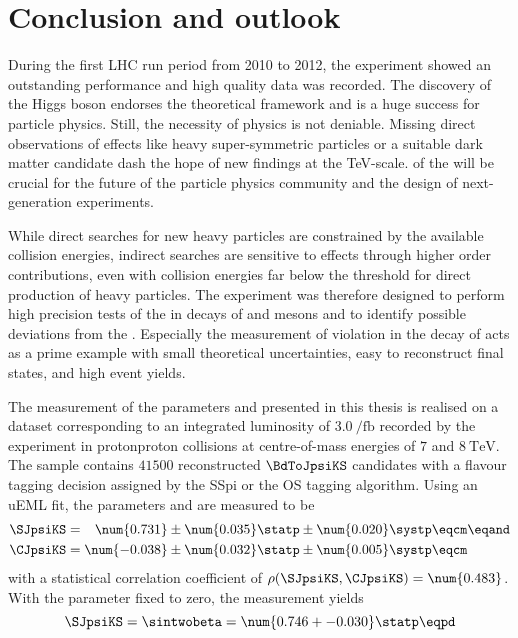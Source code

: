 
\chapter{Conclusion and outlook}
\label{ch:conclusion}

During the first \acs{LHC} run period from 2010 to 2012, the \LHCb experiment
showed an outstanding performance and high quality data was recorded. The
discovery of the Higgs boson \cite{Aad:2015zhl} endorses the theoretical
framework and is a huge success for particle physics. Still, the necessity of
\BSM physics is not deniable. Missing direct observations of \BSM effects like
heavy super-symmetric particles or a suitable dark matter candidate dash the
hope of new findings at the \si{TeV}-scale. \RunTwo of the \LHC will be crucial
for the future of the particle physics community and the design of
next-generation experiments.

While direct searches for new heavy particles are constrained by the available
collision energies, indirect searches are sensitive to \BSM effects through
higher order contributions, even with collision energies far below the threshold
for direct production of heavy particles. The \LHCb experiment was therefore
designed to perform high precision tests of the \SM in decays of \B and \D
mesons and to identify possible deviations from the \SM. Especially the
measurement of \CP violation in the decay of \BdToJpsiKS acts as a prime example
with small theoretical uncertainties, easy to reconstruct final states, and high
event yields.

The measurement of the \CP parameters \SJpsiKS and \CJpsiKS presented in this
thesis is realised on a dataset corresponding to an integrated luminosity of
$\SI{3.0}{\per\femto\barn}$ recorded by the \LHCb experiment in
\acl{protonproton} collisions at centre-of-mass energies of $\num{7}$ and
$\SI{8}{\TeV}$. The sample contains $\num{41500}$ reconstructed $\BdToJpsiKS$
candidates with a flavour tagging decision assigned by the \acl{SSpi} or the
\acl{OS} tagging algorithm. Using an \acl{uEML} fit, the \CP parameters
\SJpsiKS and \CJpsiKS are measured to be
%
\begin{equation*}
  \begin{split}
    \SJpsiKS &= \phantom{-}\num{0.731} \pm \num{0.035} \statp \pm \num{0.020} \systp \eqcm\eqand \\
    \CJpsiKS &=           \num{-0.038} \pm \num{0.032} \statp \pm \num{0.005} \systp \eqcm
  \end{split}
\end{equation*}
%
with a statistical correlation coefficient of $\rho(\SJpsiKS,\CJpsiKS) =
\num{0.483}$. With the parameter \CJpsiKS fixed to zero, the measurement yields
%
\begin{equation*}
  \SJpsiKS = \sintwobeta = \num{0.746 +- 0.030}\statp \eqpd
\end{equation*}

